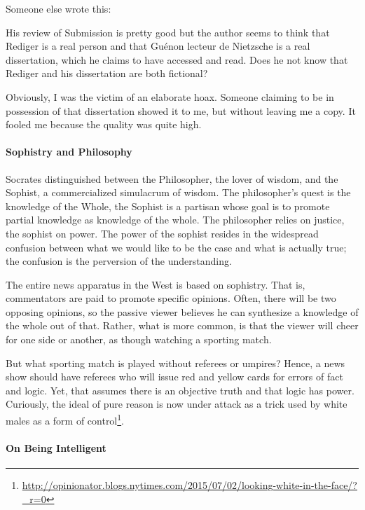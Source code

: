 Someone else wrote this:

\begin{quotex} 
His review of Submission is pretty good but the author seems to think that Rediger is a real person and that Guénon lecteur de Nietzsche is a real dissertation, which he claims to have accessed and read. Does he not know that Rediger and his dissertation are both fictional?
\end{quotex}


Obviously, I was the victim of an elaborate hoax. Someone claiming to be in possession of that dissertation showed it to me, but without leaving me a copy. It fooled me because the quality was quite high.

\paragraph{Sophistry and Philosophy}


Socrates distinguished between the Philosopher, the lover of wisdom, and the Sophist, a commercialized simulacrum of wisdom. The philosopher's quest is the knowledge of the Whole, the Sophist is a partisan whose goal is to promote partial knowledge as knowledge of the whole. The philosopher relies on justice, the sophist on power. The power of the sophist resides in the widespread confusion between what we would like to be the case and what is actually true; the confusion is the perversion of the understanding.

The entire news apparatus in the West is based on sophistry. That is, commentators are paid to promote specific opinions. Often, there will be two opposing opinions, so the passive viewer believes he can synthesize a knowledge of the whole out of that. Rather, what is more common, is that the viewer will cheer for one side or another, as though watching a sporting match.

But what sporting match is played without referees or umpires? Hence, a news show should have referees who will issue red and yellow cards for errors of fact and logic. Yet, that assumes there is an objective truth and that logic has power. Curiously, the ideal of pure reason is now under attack as a trick used by white males as a form of control\footnote{\url{http://opinionator.blogs.nytimes.com/2015/07/02/looking-white-in-the-face/?_r=0}}.

\paragraph{On Being Intelligent}


